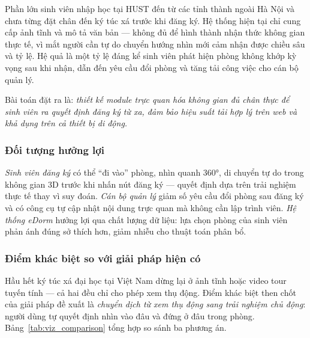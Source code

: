\documentclass[../DoAn.tex]{subfiles}
\begin{document}
Phần lớn sinh viên nhập học tại HUST đến từ các tỉnh thành ngoài Hà Nội và
chưa từng đặt chân đến ký túc xá trước khi đăng ký. Hệ thống hiện tại chỉ
cung cấp ảnh tĩnh và mô tả văn bản --- không đủ để hình thành nhận thức không
gian thực tế, vì mắt người cần tự do chuyển hướng nhìn mới cảm nhận được
chiều sâu và tỷ lệ. Hệ quả là một tỷ lệ đáng kể sinh viên phát hiện phòng
không khớp kỳ vọng sau khi nhận, dẫn đến yêu cầu đổi phòng và tăng tải công
việc cho cán bộ quản lý.

Bài toán đặt ra là: \textit{thiết kế module trực quan hóa không gian đủ chân
thực để sinh viên ra quyết định đăng ký từ xa, đảm bảo hiệu suất tải hợp lý
trên web và khả dụng trên cả thiết bị di động.}

\subsubsection{Đối tượng hưởng lợi}

\textit{Sinh viên đăng ký} có thể ``đi vào'' phòng, nhìn quanh 360°, di
chuyển tự do trong không gian 3D trước khi nhấn nút đăng ký --- quyết định
dựa trên trải nghiệm thực tế thay vì suy đoán. \textit{Cán bộ quản lý} giảm
số yêu cầu đổi phòng sau đăng ký và có công cụ tự cập nhật nội dung trực quan
mà không cần lập trình viên. \textit{Hệ thống eDorm} hưởng lợi qua chất lượng
dữ liệu: lựa chọn phòng của sinh viên phản ánh đúng sở thích hơn, giảm nhiễu
cho thuật toán phân bổ.

\subsubsection{Điểm khác biệt so với giải pháp hiện có}

Hầu hết ký túc xá đại học tại Việt Nam dừng lại ở ảnh tĩnh hoặc video tour
tuyến tính --- cả hai đều chỉ cho phép xem thụ động. Điểm khác biệt then chốt
của giải pháp đề xuất là \textit{chuyển dịch từ xem thụ động sang trải nghiệm
chủ động}: người dùng tự quyết định nhìn vào đâu và đứng ở đâu trong phòng.
Bảng~\ref{tab:viz_comparison} tổng hợp so sánh ba phương án.
\end{document}

